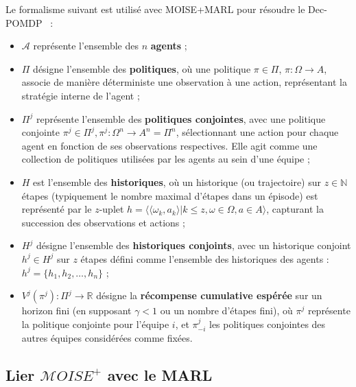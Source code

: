 \documentclass[pdflatex,sn-mathphys-num]{sn-jnl}%
\theoremstyle{thmstyleone}%
\theoremstyle{thmstyletwo}%
\theoremstyle{thmstylethree}%
\begin{document}
Le formalisme suivant est utilisé avec MOISE+MARL pour résoudre le Dec-POMDP~\cite{Beynier2013,Albrecht2024} :
\begin{itemize}
    \item $\mathcal{A}$ représente l’ensemble des $n$ \textbf{agents} ;
    \item $\Pi$ désigne l’ensemble des \textbf{politiques}, où une politique $\pi \in \Pi$, $\pi: \Omega \rightarrow A$, associe de manière déterministe une observation à une action, représentant la stratégie interne de l’agent ;
    \item $\Pi^{j}$ représente l’ensemble des \textbf{politiques conjointes}, avec une politique conjointe $\pi^{j} \in \Pi^{j}, \pi^{j}: \Omega^n \rightarrow A^n = \Pi^n$, sélectionnant une action pour chaque agent en fonction de ses observations respectives. Elle agit comme une collection de politiques utilisées par les agents au sein d’une équipe ;
    \item $H$ est l’ensemble des \textbf{historiques}, où un historique (ou trajectoire) sur $z \in \mathbb{N}$ étapes (typiquement le nombre maximal d’étapes dans un épisode) est représenté par le $z$-uplet $h = \langle \langle \omega_{k}, a_{k}\rangle | k \leq z, \omega \in \Omega, a \in A\rangle$, capturant la succession des observations et actions ;
    \item $H^{j}$ désigne l’ensemble des \textbf{historiques conjoints}, avec un historique conjoint $h^{j} \in H^{j}$ sur $z$ étapes défini comme l’ensemble des historiques des agents : $h^{j} = \{h_1, h_2, \dots, h_n\}$ ;
    \item $V^{j}(\pi^{j}): \Pi^{j} \rightarrow \mathbb{R}$ désigne la \textbf{récompense cumulative espérée} sur un horizon fini (en supposant $\gamma < 1$ ou un nombre d’étapes fini), où $\pi^{j}$ représente la politique conjointe pour l’équipe $i$, et $\pi^{j}_{-i}$ les politiques conjointes des autres équipes considérées comme fixées.
\end{itemize}


\subsection{Lier $\mathcal{M}OISE^+$ avec le MARL}
\end{document}
